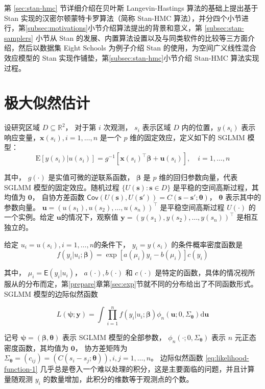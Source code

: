 \documentclass[12pt,a4paper,UTF8,twoside]{book}
\theoremstyle{definition}
\theoremstyle{definition}
\theoremstyle{definition}
\theoremstyle{remark}
\begin{document}
第 \ref{sec:stan-hmc} 节详细介绍在贝叶斯 Langevin-Hastings 算法的基础上提出基于 Stan 实现的汉密尔顿蒙特卡罗算法（简称 Stan-HMC 算法），并分四个小节进行，第\ref{subsec:motivations}小节介绍算法提出的背景和意义，第 \ref{subsec:stan-samplers} 小节从 Stan 的发展、内置算法设置以及与同类软件的比较等三方面介绍，然后以数据集 Eight Schools 为例子介绍 Stan 的使用，为空间广义线性混合效应模型的 Stan 实现作铺垫，第\ref{subsec:stan-hmc}小节介绍 Stan-HMC 算法实现过程。

\hypertarget{sec:mle}{%
\section{极大似然估计}\label{sec:mle}}

设研究区域 \(D \subseteq \mathbb{R}^2\)， 对于第 \(i\) 次观测， \(s_i\) 表示区域 \(D\) 内的位置，\(y(s_i)\) 表示响应变量，\(\mathbf{x}(s_i), i = 1, \ldots, n\) 是一个 \(p\) 维的固定效应，定义如下的 SGLMM 模型：
\[
\mathrm{E}[y(s_i)|u(s_i)] = g^{-1}[\mathbf{x}(s_i)^{\top}\boldsymbol{\beta} + \mathbf{u}(s_i)], \quad i = 1, \ldots, n
\]

\noindent 其中， \(g(\cdot)\) 是实值可微的逆联系函数， \(\boldsymbol{\beta}\) 是 \(p\) 维的回归参数向量，代表 SGLMM 模型的固定效应。随机过程 \(\{U(\mathbf{s}): \mathbf{s} \in D\}\) 是平稳的空间高斯过程，其均值为 \(\mathbf{0}\)， 自协方差函数 \(\mathsf{Cov}(U(\mathbf{s}),U(\mathbf{s}')) = C(\mathbf{s} - \mathbf{s}'; \boldsymbol{\theta})\)， \(\boldsymbol{\theta}\) 表示其中的参数向量。 \(\mathbf{u} = (u(s_1),u(s_2),\ldots,u(s_n))^{\top}\) 是平稳空间高斯过程 \(U(\cdot)\) 的一个实例。给定 \(\mathbf{u}\)的情况下，观察值 \(\mathbf{y} = (y(s_1),y(s_2),\ldots,y(s_n))^{\top}\) 是相互独立的。

给定 \(u_i = u(s_i), i = 1, \ldots, n\)的条件下， \(y_i = y(s_i)\) 的条件概率密度函数是
\[
f(y_i|u_i;\boldsymbol{\beta}) = \exp[a(\mu_i)y_i - b(\mu_i)]c(y_i)
\]

\noindent 其中， \(\mu_i = \mathsf{E}(y_i|u_i)\)， \(a(\cdot),b(\cdot)\) 和 \(c(\cdot)\) 是特定的函数，具体的情况视所服从的分布而定，第\ref{prepare}章第\ref{sec:exp}节就不同的分布给出了不同函数形式。 SGLMM 模型的边际似然函数

\begin{equation}
L(\boldsymbol{\psi};\mathbf{y}) = \int \prod_{i=1}^{n} f(y_i|u_i;\boldsymbol{\beta})\phi_{n}(\mathbf{u};0,\Sigma_{\boldsymbol{\theta}})\mathrm{d}\mathbf{u} \label{eq:likelihood-function-1}
\end{equation}

\noindent 记号 \(\boldsymbol{\psi} = (\boldsymbol{\beta},\boldsymbol{\theta})\) 表示 SGLMM 模型的全部参数， \(\phi_{n}(\cdot;0,\Sigma_{\boldsymbol{\theta}})\) 表示 \(n\) 元正态密度函数，其均值为 \(\mathbf{0}\)， 协方差矩阵为 \(\Sigma_{\boldsymbol{\theta}} = (c_{ij}) = (C(s_i - s_j; \boldsymbol{\theta})), i,j = 1, \ldots, n\)。 边际似然函数 \eqref{eq:likelihood-function-1} 几乎总是卷入一个难以处理的积分，这是主要面临的问题，并且计算量随观测 \(y_i\) 的数量增加，此积分的维数等于观测点的个数。
\end{document}
